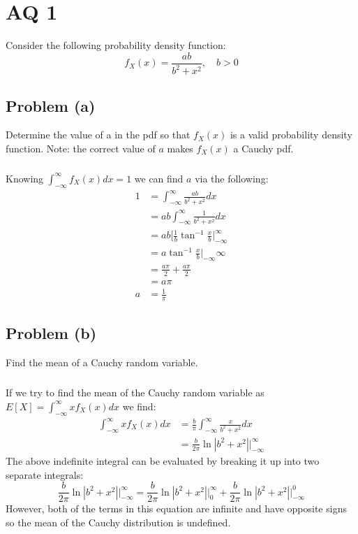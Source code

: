 \documentclass[11pt]{article}
\begin{document}
\section*{AQ 1}
Consider the following probability density function:
\begin{equation*}
	f_X(x) = \frac{ab}{b^2+x^2},\quad b>0
\end{equation*}

\subsection*{Problem (a)}
Determine the value of a in the pdf so that $f_X(x)$ is a valid probability density function. Note: the correct value of $a$ makes $f_X(x)$ a Cauchy pdf.

\subparagraph*{}
Knowing $\int_{-\infty}^\infty f_X(x)dx = 1$ we can find $a$ via the following:
\begin{align*}
	1 &= \int_{-\infty}^\infty \frac{ab}{b^2+x^2}dx \\
	&= ab\int_{-\infty}^\infty \frac{1}{b^2 + x^2}dx \\
	&= ab\Bigg[\frac{1}{b}\tan^{-1}\frac{x}{b}\Bigg|_{-\infty}^\infty \\
	&= a\tan^{-1}\frac{x}{b}\Bigg|_{-\infty}{\infty} \\
	&= \frac{a\pi}{2}  + \frac{a\pi}{2} \\
	&= a\pi \\ 
	a &= \frac{1}{\pi}
\end{align*}

\subsection*{Problem (b)}
Find the mean of a Cauchy random variable.

\subparagraph*{}
If we try to find the mean of the Cauchy random variable as $E[X]=\int_{-\infty}^\infty xf_X(x)dx$ we find:
\begin{align*}
	\int_{-\infty}^\infty xf_X(x)dx &= \frac{b}{\pi}\int_{-\infty}^\infty\frac{x}{b^2+x^2}dx \\
	&= \frac{b}{2\pi}\ln|b^2+x^2|\Big|_{-\infty}^\infty 
\end{align*}
The above indefinite integral can be evaluated by breaking it up into two separate integrals:
\begin{equation*}
	\frac{b}{2\pi}\ln|b^2+x^2|\Big|_{-\infty}^\infty = \frac{b}{2\pi}\ln|b^2+x^2|\Big|_{0}^\infty + \frac{b}{2\pi}\ln|b^2+x^2|\Big|_{-\infty}^0
\end{equation*}
However, both of the terms in this equation are infinite and have opposite signs so the mean of the Cauchy distribution is undefined.
\end{document}
